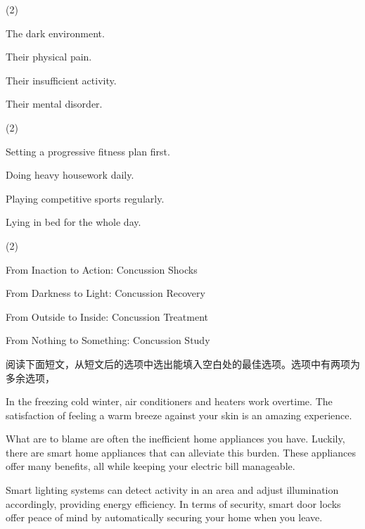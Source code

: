 \documentclass{英语试卷}
\begin{document}
\begin{choices}(2)
  \item The dark environment.
  \item Their physical pain.
  \item Their insufficient activity.
  \item Their mental disorder.
\end{choices}
\begin{choices}(2)
  \item Setting a progressive fitness plan first.
  \item Doing heavy housework daily.
  \item Playing competitive sports regularly.
  \item Lying in bed for the whole day.
\end{choices}
\begin{choices}(2)
  \item From Inaction to Action: Concussion Shocks
  \item From Darkness to Light: Concussion Recovery
  \item From Outside to Inside: Concussion Treatment
  \item From Nothing to Something: Concussion Study
\end{choices}
\par 阅读下面短文，从短文后的选项中选出能填入空白处的最佳选项。选项中有两项为多余选项，\par
\par In the freezing cold winter, air conditioners and heaters work overtime. The satisfaction of feeling a warm breeze against your skin is an amazing experience. \par
\par What are to blame are often the inefficient home appliances you have. Luckily, there are smart home appliances that can alleviate this burden. These appliances offer many benefits, all while keeping your electric bill manageable.\par
\par {} Smart lighting systems can detect activity in an area and adjust illumination accordingly, providing energy efficiency. In terms of security, smart door locks offer peace of mind by automatically securing your home when you leave.\par
\end{document}
